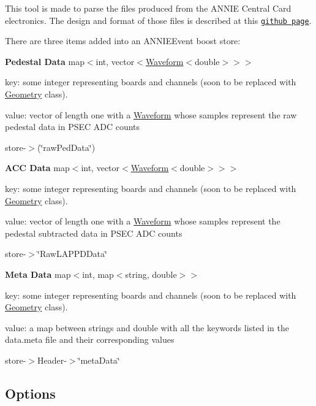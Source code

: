 This tool is made to parse the files produced from the A\-N\-N\-I\-E Central Card electronics. The design and format of those files is described at this \href{https://github.com/lappd-daq/acdc-daq}{\tt github page}.

There are three items added into an {\ttfamily A\-N\-N\-I\-E\-Event} boost store\-:

{\bfseries Pedestal Data} {\ttfamily map$<$int, vector$<$\hyperlink{classWaveform}{Waveform}$<$double$>$$>$$>$}
\begin{DoxyItemize}
\item key\-: some integer representing boards and channels (soon to be replaced with \hyperlink{classGeometry}{Geometry} class).
\item value\-: vector of length one with a \hyperlink{classWaveform}{Waveform} whose samples represent the raw pedestal data in P\-S\-E\-C A\-D\-C counts
\item store-\/$>$(\char`\"{}raw\-Ped\-Data\char`\"{})
\end{DoxyItemize}

{\bfseries A\-C\-C Data} {\ttfamily map$<$int, vector$<$\hyperlink{classWaveform}{Waveform}$<$double$>$$>$$>$}
\begin{DoxyItemize}
\item key\-: some integer representing boards and channels (soon to be replaced with \hyperlink{classGeometry}{Geometry} class).
\item value\-: vector of length one with a \hyperlink{classWaveform}{Waveform} whose samples represent the pedestal subtracted data in P\-S\-E\-C A\-D\-C counts
\item store-\/$>$\char`\"{}\-Raw\-L\-A\-P\-P\-D\-Data\char`\"{}
\end{DoxyItemize}

{\bfseries Meta Data} {\ttfamily map$<$int, map$<$string, double$>$$>$}
\begin{DoxyItemize}
\item key\-: some integer representing boards and channels (soon to be replaced with \hyperlink{classGeometry}{Geometry} class).
\item value\-: a map between strings and double with all the keywords listed in the data.\-meta file and their corresponding values
\item store-\/$>$Header-\/$>$\char`\"{}meta\-Data\char`\"{}
\end{DoxyItemize}

\subsection*{Options}

